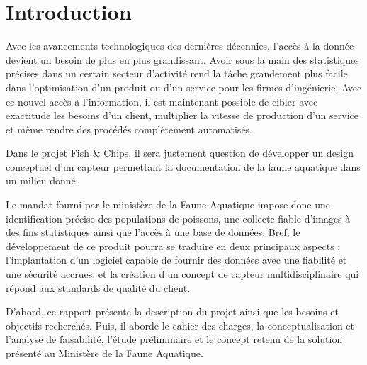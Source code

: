 
%
%

\chapter{Introduction}
\label{s:intro}

Avec les avancements technologiques des dernières décennies, l'accès à la donnée devient un besoin de plus en plus grandissant. Avoir sous la main des statistiques précises dans un certain secteur d'activité rend la tâche grandement plus facile dans l'optimisation d'un produit ou d'un service pour les firmes d'ingénierie. Avec ce nouvel accès à l'information, il est maintenant possible de cibler avec exactitude les besoins d'un client, multiplier la vitesse de production d'un service et même rendre des procédés complètement automatisés.

Dans le projet Fish \& Chips, il sera justement question de développer un design conceptuel d'un capteur permettant la documentation de la faune aquatique dans un milieu donné.

Le mandat fourni par le ministère de la Faune Aquatique impose donc une identification précise des populations de poissons, une collecte fiable d'images à des fins statistiques ainsi que l'accès à une base de données. Bref, le développement de ce produit pourra se traduire en deux principaux aspects : l'implantation d'un logiciel capable de fournir des données avec une fiabilité et une sécurité accrues, et la création d'un concept de capteur multidisciplinaire qui répond aux standards de qualité du client. 

D'abord, ce rapport présente la description du projet ainsi que les besoins et objectifs recherchés. Puis, il aborde le cahier des charges, la conceptualisation et l’analyse de faisabilité, l’étude préliminaire et le concept retenu de la solution présenté au Ministère de la Faune Aquatique.





